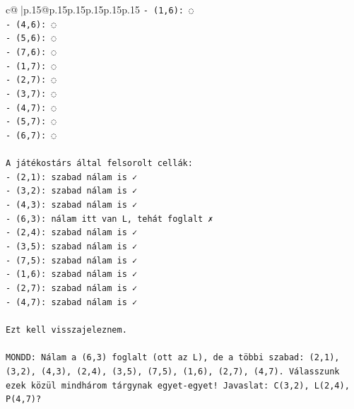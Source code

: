 \documentclass{article}
\begin{document}
{\begin{supertabular}{c@{$\;$}|p{.15\linewidth}@{}p{.15\linewidth}p{.15\linewidth}p{.15\linewidth}p{.15\linewidth}p{.15\linewidth}}
{{{\texttt{{-} (1,6): ◌} \\
\texttt{{-} (4,6): ◌} \\
\texttt{{-} (5,6): ◌} \\
\texttt{{-} (7,6): ◌} \\
\texttt{{-} (1,7): ◌} \\
\texttt{{-} (2,7): ◌} \\
\texttt{{-} (3,7): ◌} \\
\texttt{{-} (4,7): ◌} \\
\texttt{{-} (5,7): ◌} \\
\texttt{{-} (6,7): ◌} \\
\\ 
\texttt{A játékostárs által felsorolt cellák:} \\
\texttt{{-} (2,1): szabad nálam is ✓} \\
\texttt{{-} (3,2): szabad nálam is ✓} \\
\texttt{{-} (4,3): szabad nálam is ✓} \\
\texttt{{-} (6,3): nálam itt van L, tehát foglalt ✗} \\
\texttt{{-} (2,4): szabad nálam is ✓} \\
\texttt{{-} (3,5): szabad nálam is ✓} \\
\texttt{{-} (7,5): szabad nálam is ✓} \\
\texttt{{-} (1,6): szabad nálam is ✓} \\
\texttt{{-} (2,7): szabad nálam is ✓} \\
\texttt{{-} (4,7): szabad nálam is ✓} \\
\\ 
\texttt{Ezt kell visszajeleznem.} \\
\\ 
\texttt{MONDD: Nálam a (6,3) foglalt (ott az L), de a többi szabad: (2,1), (3,2), (4,3), (2,4), (3,5), (7,5), (1,6), (2,7), (4,7). Válasszunk ezek közül mindhárom tárgynak egyet{-}egyet! Javaslat: C(3,2), L(2,4), P(4,7)?} \\
            }
        }
    }
     \\ \\


\end{supertabular}}
\end{document}
